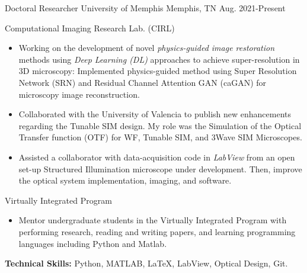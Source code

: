 

\begin{cventries}

  \cventry
    {Doctoral Researcher} %
    {University of Memphis} %
    {Memphis, TN} %
    {Aug. 2021-Present} %
    {
      \begin{cvitems} %
      \item{Computational Imaging Research Lab. (CIRL)}
      \begin{itemize}[label= - ]
                \item{Working on the development of novel \textit{physics-guided image restoration} methods using \textit{Deep Learning (DL)} approaches to achieve super-resolution in 3D microscopy: Implemented physics-guided method using Super Resolution Network (SRN) and Residual Channel Attention GAN (caGAN) for microscopy image reconstruction.}
              \item{Collaborated with the University of Valencia to publish new enhancements regarding the Tunable SIM design. My role was the Simulation of the Optical Transfer function (OTF) for WF, Tunable SIM, and 3Wave SIM Microscopes.}
              \item{Assisted a collaborator with data-acquisition code in \textit{LabView} from an open set-up Structured Illumination microscope under development. Then, improve the optical system implementation, imaging, and software.}
        \end{itemize}    
        \item{Virtually Integrated Program}
        \begin{itemize}
              \item {Mentor undergraduate students in the Virtually Integrated Program with performing research, reading and writing papers, and learning programming languages including Python and Matlab.}
        \end{itemize}
          \item {\textbf{Technical Skills:} Python, MATLAB, \LaTeX, LabView, Optical Design, Git.}

\end{cvitems}}
\end{cventries}

